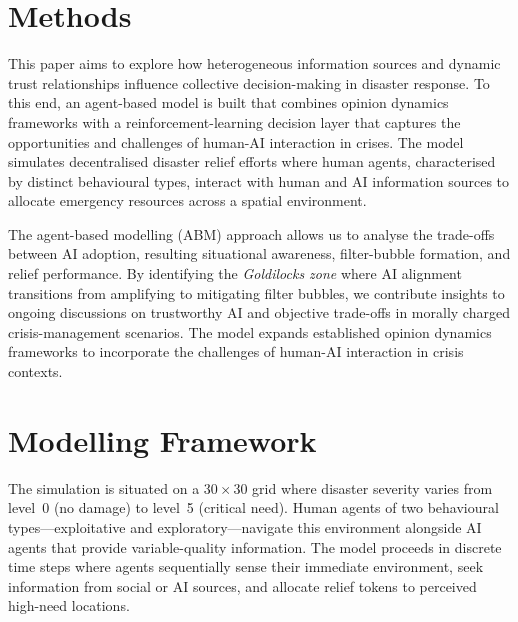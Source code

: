 
\section{Methods}

This paper aims to explore how heterogeneous information sources and dynamic trust
relationships influence collective decision-making in disaster response.
To this end, an agent-based model is built that combines opinion dynamics frameworks
with a reinforcement-learning decision layer that captures the opportunities and
challenges of human-AI interaction in crises.
The model simulates decentralised disaster relief efforts where human agents,
characterised by distinct behavioural types, interact with human and AI information
sources to allocate emergency resources across a spatial environment.

The agent-based modelling (ABM) approach allows us to analyse the trade-offs between
AI adoption, resulting situational awareness, filter-bubble formation, and relief
performance.
By identifying the \emph{Goldilocks zone} where AI alignment transitions from
amplifying to mitigating filter bubbles, we contribute insights to ongoing discussions
on trustworthy AI and objective trade-offs in morally charged crisis-management
scenarios.
The model expands established opinion dynamics frameworks \citep{geschke2019triple}
to incorporate the challenges of human-AI interaction in crisis contexts.

\section{Modelling Framework}

The simulation is situated on a $30\times30$ grid where disaster severity varies from
level~0 (no damage) to level~5 (critical need).
Human agents of two behavioural types---exploitative and exploratory---navigate this
environment alongside AI agents that provide variable-quality information.
The model proceeds in discrete time steps where agents sequentially sense their
immediate environment, seek information from social or AI sources, and allocate
relief tokens to perceived high-need locations.

